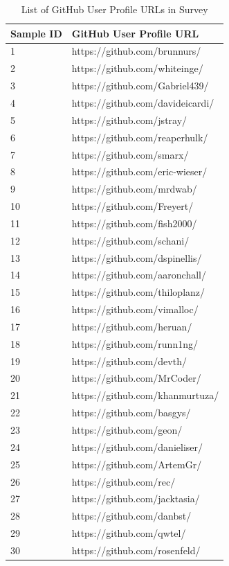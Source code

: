 \begin{center}
\begin{longtable}{|p{2cm}|p{7cm}|}
\caption{List of GitHub User Profile URLs in Survey} \label{survey_GH_userURLS} \\
 \hline
\textbf{Sample ID} & \textbf{GitHub User Profile URL} \\
 \hline
1 & https://github.com/brunnurs/ \\
2 & https://github.com/whiteinge/ \\
3 & https://github.com/Gabriel439/ \\
4 & https://github.com/davideicardi/ \\
5 & https://github.com/jstray/ \\
6 & https://github.com/reaperhulk/ \\
7 & https://github.com/smarx/ \\
8 & https://github.com/eric-wieser/ \\
9 & https://github.com/mrdwab/ \\
10 & https://github.com/Freyert/ \\
11 & https://github.com/fish2000/ \\
12 & https://github.com/schani/ \\
13 & https://github.com/dspinellis/ \\
14 & https://github.com/aaronchall/ \\
15 & https://github.com/thiloplanz/ \\
16 & https://github.com/vimalloc/ \\
17 & https://github.com/heruan/ \\
18 & https://github.com/runn1ng/ \\
19 & https://github.com/devth/ \\
20 & https://github.com/MrCoder/ \\
21 & https://github.com/khanmurtuza/ \\
22 & https://github.com/basgys/ \\
23 & https://github.com/geon/ \\
24 & https://github.com/danieliser/ \\
25 & https://github.com/ArtemGr/ \\
26 & https://github.com/rec/ \\
27 & https://github.com/jacktasia/ \\
28 & https://github.com/danbst/ \\
29 & https://github.com/qwtel/ \\
30 & https://github.com/rosenfeld/ \\

\end{longtable}
\end{center}

